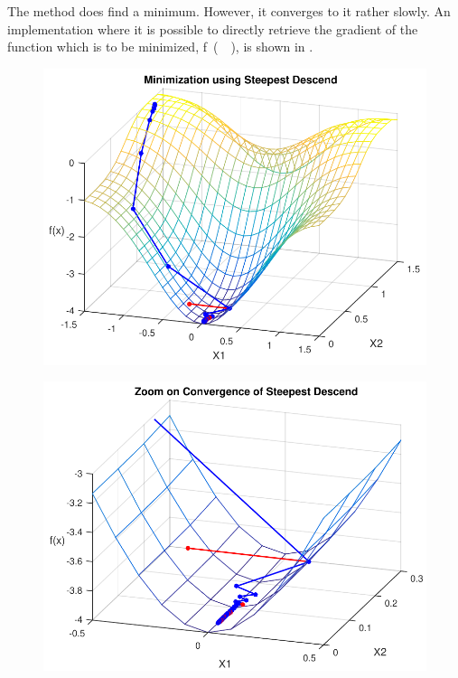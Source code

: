 The method does find a minimum. However, it converges to it rather slowly. An implementation where it is possible to directly retrieve the gradient of the function which is to be minimized, \si{f()}, is shown in .

\begin{minipage}{\linewidth}
	\begin{minipage}{0.45\linewidth}
		\begin{figure}[H]
			\includegraphics[scale=.6]{figures/steepestDescendEx}
			\centering
			\captionsetup{justification=centering}
			\label{steepestDescendEx}
		\end{figure}
	\end{minipage}
	\hspace{0.03\linewidth}
	\begin{minipage}{0.45\linewidth}
		\begin{figure}[H]
			\includegraphics[scale=.6]{figures/steepestDesendExZoom}

\end{figure}
\end{minipage}
\end{minipage}
